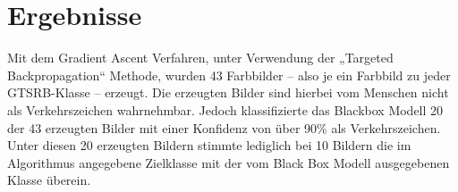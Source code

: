 %
%
%
%
%
%


\section{Ergebnisse}
Mit dem Gradient Ascent Verfahren, unter Verwendung der „Targeted Backpropagation“ Methode, wurden 43 Farbbilder – also je ein Farbbild zu jeder \ac{GTSRB}-Klasse – erzeugt. 
Die erzeugten Bilder sind hierbei vom Menschen nicht als Verkehrszeichen wahrnehmbar. Jedoch klassifizierte das Blackbox Modell 20 der 43 erzeugten Bilder mit einer Konfidenz von über 90\% als Verkehrszeichen. 
Unter diesen 20 erzeugten Bildern stimmte lediglich bei 10 Bildern die im Algorithmus angegebene Zielklasse mit der vom Black Box Modell ausgegebenen Klasse überein.


~\newline


